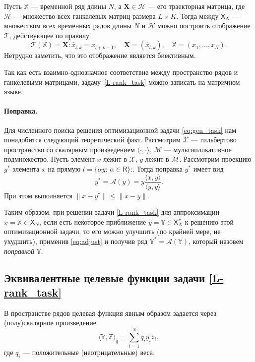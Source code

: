 \documentclass[12pt,a4paper,fleqn,leqno]{article}
\newcommand{\tsX}{\mathbb{X}}
\newcommand{\tsY}{\mathbb{Y}}
\newcommand{\tsZ}{\mathbb{Z}}
\newcommand{\bfX}{\mathbf{X}}
\newcommand{\calA}{\mathcal{A}}
\newcommand{\calH}{\mathcal{H}}
\newcommand{\calM}{\mathcal{M}}
\newcommand{\calT}{\mathcal{T}}
\newcommand{\calX}{\mathcal{X}}
\newcommand{\sfR}{\mathsf{R}}
\newcommand{\sfX}{\mathsf{X}}
\begin{document}
Пусть $\tsX$ --- временной ряд длины $N$, а $\bfX \in \calH$ --- его траекторная матрица, где $\calH$ --- множество всех ганкелевых матриц размера $L \times K$. Тогда между $\sfX_N$ --- множеством всех временных рядов длины $N$ и $\calH$ можно построить отображение $\calT$, действующее по правилу
\begin{equation*}
\calT(\tsX) = \bfX: \hat x_{l, k} = x_{l + k - 1}, \quad \bfX = (\hat x_{l,k}), \quad \tsX = (x_1, \ldots, x_N).
\end{equation*}
Нетрудно заметить, что это отображение является биективным.

Так как есть взаимно-однозначное соответствие между пространство рядов и ганкелевыми матрицами,
задачу~\eqref{L-rank_task} можно записать на матричном языке.

\paragraph{Поправка.} Для численного поиска решения оптимизационной задачи \eqref{eq:gen_task} нам понадобится следующий теоретический факт.
Рассмотрим $\calX$ --- гильбертово пространство со скалярным произведением $\langle\cdot, \cdot\rangle$, $\calM$ --- мультипликативное подмножество. Пусть элемент $x$ лежит в $\calX$, $y$ лежит в $\calM$. Рассмотрим проекцию $y^*$ элемента $x$ на прямую $l = \{\alpha y:\, \alpha \in \sfR\}$:. Тогда поправка $y^*$ имеет вид
\begin{equation}
\label{eq:adjust}
y^* = \calA(y)= y \frac{\langle x, y\rangle}{\langle y, y\rangle}.
\end{equation}
При этом выполняется $\|x - y^*\| \le \|x - y\|$.

Таким образом, при решении задачи \eqref{L-rank_task} для аппроксимации $x=\tsX \in \sfX_N$, если есть некоторое приближение $y=\tsY \in \sfX_N^r$ к решению этой оптимизационной задачи, то его можно улучшить (по крайней мере, не ухудшить), применив \eqref{eq:adjust} и получив ряд $\tsY^*=\calA(\tsY)$, который назовем \emph{поправкой $\tsY$}.

\subsection{Эквивалентные целевые функции задачи \eqref{L-rank_task}}
В пространстве рядов целевая функция явным образом задается через (полу)скалярное произведение
\begin{equation}
\label{eq:norm_ser}
    \langle\tsY,\tsZ\rangle_q = \sum_{i = 1}^N q_i y_i z_i,
\end{equation}
где $q_i$ --- положительные (неотрицательные) веса.
\end{document}
